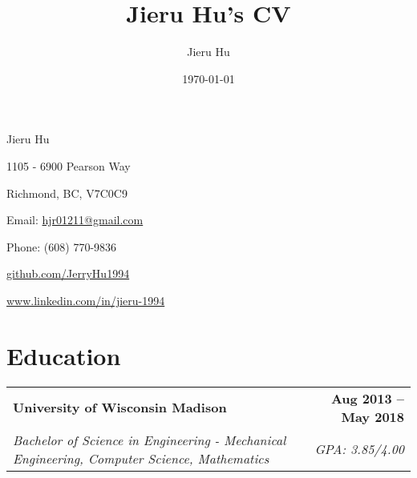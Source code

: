 \documentclass[a4paper,11pt]{article}
\makeatletter
\newcommand{\educationHeader}[4]{
  \vspace{-1pt}
    \begin{tabular*}{0.97\textwidth}{l@{\extracolsep{\fill}}r}
      \textbf{#1} & \textbf{#2} \\
      \textit{\small#3} & \textit{\small #4} \\
    \end{tabular*}\vspace{-5pt}
}
\newcommand{\courseWork}[3]{
  \vspace{-1pt}
    \begin{tabular*}{0.97\textwidth}{l@{\extracolsep{\fill}}r}
      \textit{\small #1}\\
    	  \textit{\small #2}\\
       \textit{\small #3}\\
    \end{tabular*}\vspace{-5pt}
}
\makeatother
\begin{document}
\title{Jieru Hu's CV}
\author{Jieru Hu}
\date{\today}

\begin{center}
{\Huge Jieru Hu}\par\bigskip
\begin{minipage}[b]{0.33333\textwidth}
\raggedright
1105 - 6900 Pearson Way\par
Richmond, BC, V7C0C9
\end{minipage}%
\begin{minipage}[b]{0.33333\textwidth}
\centering
Email: \href{mailto:hjr01211@gmail.com}{hjr01211@gmail.com}\par
Phone: (608) 770-9836
\end{minipage}%
\begin{minipage}[b]{0.33333\textwidth}
\raggedleft
\href{github.com/JerryHu1994}{github.com/JerryHu1994}\par
\href{www.linkedin.com/in/jieru-1994}{www.linkedin.com/in/jieru-1994}
\end{minipage}
\end{center}


\section{Education}
	\educationHeader
	{University of Wisconsin Madison}{Aug 2013 – May 2018}
	{Bachelor of Science in Engineering - Mechanical Engineering, Computer Science, Mathematics}{GPA: 3.85/4.00}


\end{document}
